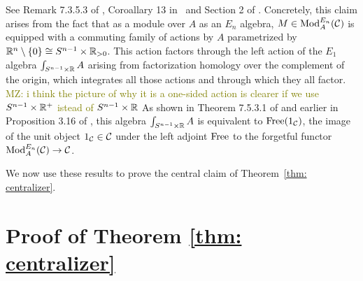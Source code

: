 \documentclass[11pt]{amsart}
\numberwithin{equation}{section}
\def\mahmoud{\textcolor{olive}{MZ: }\textcolor{olive}}
\begin{document}
See Remark 7.3.5.3 of \cite{LurieHA}, Coroallary 13 in~\cite{GG-Notes} and Section 2 of \cite{FrancisHH}.
Concretely, this claim arises from the fact that as a module over $A$ as an $E_n$ algebra, 
$M \in {\rm Mod}^{E_n}_A(\mathcal C)$ is equipped with a commuting family of actions by $A$ parametrized by $\mathbb R^n \setminus \{0\}\cong S^{n-1} \times \mathbb R_{>0}$.
This action factors through the left action of the $E_1$ algebra $\int_{S^{n-1} \times \mathbb R} A$ arising from factorization homology over the complement of the origin,
which integrates all those actions and through which they all factor. \mahmoud{i think the picture of why it is a one-sided action is clearer if we use $S^{n-1} \times \mathbb R^+$ istead of $S^{n-1} \times \mathbb R$}
As shown in Theorem 7.5.3.1 of \cite{LurieHA} and earlier in Proposition 3.16 of \cite{FrancisHH}, 
this algebra $\int_{S^{n-1} \times \mathbb R} A$ is equivalent to ${\rm Free}(1_\mathcal C)$, 
the image of the unit object $1_\mathcal C \in \mathcal C$ under the left adjoint ${\rm Free}$ to the forgetful functor ${\rm Mod}^{E_n}_A(\mathcal C) \to \mathcal C$.

We now use these results to prove the central claim of Theorem~\ref{thm: centralizer}.

\section{Proof of Theorem \ref{thm: centralizer}}
\end{document}
